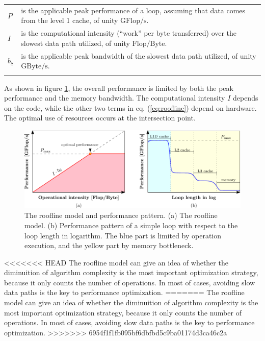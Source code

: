 \begin{tabular}{l>{\raggedright}p{}}
$P$ & is the applicable peak performance of a loop, assuming that data comes
from the level 1 cache, of unity $\mathrm{GFlop/s}$. \tabularnewline
$I$ & is the computational intensity (“work” per byte transferred) over
the slowest data path utilized, of unity $\mathrm{Flop/Byte}$. \tabularnewline
$b_{\mathrm{S}}$ & is the applicable peak bandwidth of the slowest data path utilized,
of unity $\mathrm{GByte/s}$.\tabularnewline
 & \tabularnewline
\end{tabular}

As shown in figure \ref{fig:The-roofline-model}, the overall performance
is limited by both the peak performance and the memory bandwidth.
The computational intensity $I$ depends on the code, while the other
two terms in eq. (\ref{eq:roofline}) depend on hardware. The optimal
use of resources occurs at the intersection point.

\begin{figure}[h]
\begin{centering}
\includegraphics[width=1\columnwidth]{_figure/roofline}
\par\end{centering}

\caption [The roofline model and performance pattern]{The roofline model and performance pattern. (a) The roofline model.
(b) Performance pattern of a simple loop with respect to the loop
length in logarithm. The blue part is limited by operation execution,
and the yellow part by memory bottleneck. \label{fig:The-roofline-model}}
\end{figure}


<<<<<<< HEAD
The roofline model can give an idea of whether the diminuition of
algorithm complexity is the most important optimization strategy,
because it only counts the number of operations. In most of cases,
avoiding slow data paths is the key to performance optimization.
=======
The roofline model can give an idea of whether the diminuition of algorithm
complexity is the most important optimization strategy, because it
only counts the number of operations. In most of cases, avoiding
slow data paths is the key to performance optimization.
>>>>>>> 6954f1f1fb095bf6dbfbd5c9ba01174d3ca46c2a

